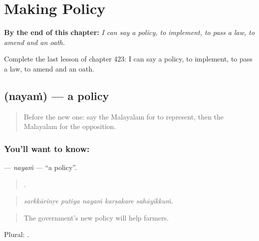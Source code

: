 
\chapter{Making Policy}
\label{ch:ml-making-policy}

\begin{chapteropening}
\textbf{By the end of this chapter:} \emph{I can say a policy, to implement, to pass a law, to amend and an oath.}

Complete the last lesson of chapter 423: I can say a policy, to implement, to pass a law, to amend and an oath.
\end{chapteropening}

\section[\texorpdfstring{\ml{നയം} (nayaṁ)}{നയം (nayaṁ)}]{ (nayaṁ) — a policy}

\label{lesson:ML-C423-nayam}



\begin{quote}
Before the new one: say the Malayalam for to represent, then the Malayalam for the opposition.
\end{quote}

\subsection*{You'll want to know: }
\textbf{} — \emph{nayaṁ} — \textquotedblleft{}a policy\textquotedblright{}.

\begin{quote}
    .
\end{quote}

\begin{quote}
\emph{sarkkārinṟe putiya nayaṁ karṣakare sahāyikkuṁ.}
\end{quote}

\begin{quote}
The government's new policy will help farmers.
\end{quote}

Plural: .

